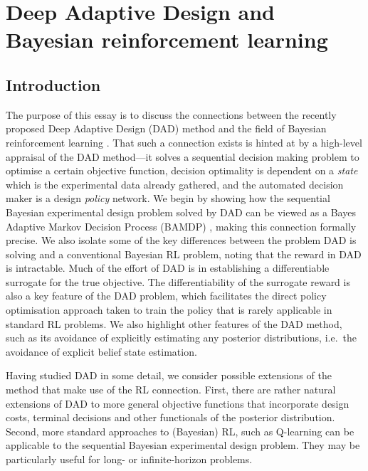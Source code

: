 \documentclass[a4paper, 10pt]{report}
\theoremstyle{plain}
\begin{document}
	
	
	
	\clearpage
	\section{Deep Adaptive Design and Bayesian reinforcement learning}
	\label{sec:brlessay}
	
	\subsection{Introduction}
	The purpose of this essay is to discuss the connections between the recently proposed Deep Adaptive Design (DAD) \citep{foster2021dad} method and the field of Bayesian reinforcement learning \citep{ghavamzadeh2016bayesian}.
	That such a connection exists is hinted at by a high-level appraisal of the DAD method---it solves a sequential decision making problem to optimise a certain objective function, decision optimality is dependent on a \emph{state} which is the experimental data already gathered, and the automated decision maker is a design \emph{policy} network.
	We begin by showing how the sequential Bayesian experimental design problem solved by DAD can be viewed as a Bayes Adaptive Markov Decision Process (BAMDP) \citep{ross2007bayes,guez2012efficient}, making this connection formally precise.
	We also isolate some of the key differences between the problem DAD is solving and a conventional Bayesian RL problem, noting that the reward in DAD is intractable. Much of the effort of DAD is in establishing a differentiable surrogate for the true objective.
	The differentiability of the surrogate reward is also a key feature of the DAD problem, which facilitates the direct policy optimisation approach taken to train the policy that is rarely applicable in standard RL problems.
	We also highlight other features of the DAD method, such as its avoidance of explicitly estimating any posterior distributions, i.e.~the avoidance of explicit belief state estimation.
	
	Having studied DAD in some detail, we consider possible extensions of the method that make use of the RL connection.
	First, there are rather natural extensions of DAD to more general objective functions that incorporate design costs, terminal decisions and other functionals of the posterior distribution.
	Second, more standard approaches to (Bayesian) RL, such as Q-learning \citep{watkins1992q,dearden1998bayesian} can be applicable to the sequential Bayesian experimental design problem. They may be particularly useful for long- or infinite-horizon problems.
	
\end{document}
